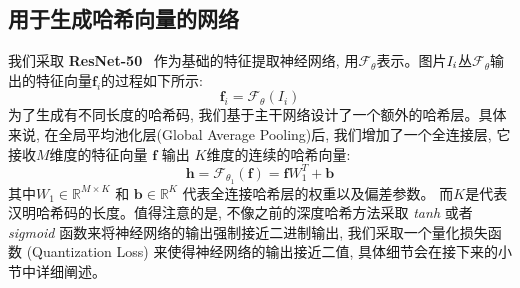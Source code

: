 \subsection{用于生成哈希向量的网络}
我们采取 \textbf{ResNet-50}~\cite{he2016deep} 作为基础的特征提取神经网络, 用$\mathcal{F}_{\theta}$表示。图片$\it{I}_i$丛$\mathcal{F}_{\theta}$输出的特征向量$\mathbf{f}_i$的过程如下所示:
\begin{equation}
    \mathbf{f}_i = \mathcal{F}_{\theta}(I_i)
\end{equation}
为了生成有不同长度的哈希码, 我们基于主干网络设计了一个额外的哈希层。具体来说, 在全局平均池化层(Global Average Pooling)后, 我们增加了一个全连接层, 它接收$M$维度的特征向量 $\mathbf{f}$ 输出 $K$维度的连续的哈希向量:
\begin{equation}
    \mathbf{h} = \mathcal{F}_{\theta_1}(\mathbf{f}) = \mathbf{f}W_1^T + \textbf{b}
\end{equation}
其中$W_1 \in \mathbb{R}^{M\times K}$ 和 $\mathbf{b} \in \mathbb{R}^{K}$ 代表全连接哈希层的权重以及偏差参数。 而$K$是代表汉明哈希码的长度。值得注意的是, 不像之前的深度哈希方法采取 \textit{tanh} 或者 \textit{sigmoid} 函数来将神经网络的输出强制接近二进制输出, 我们采取一个量化损失函数 (Quantization Loss) 来使得神经网络的输出接近二值, 具体细节会在接下来的小节中详细阐述。
